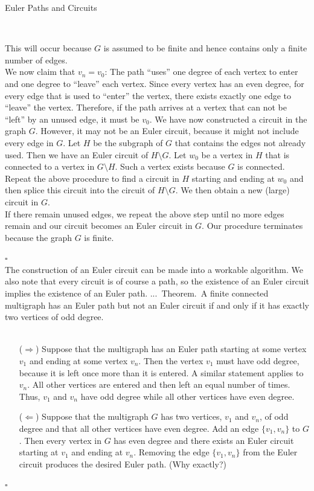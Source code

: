 \documentclass[smaller,hyperref={CJKbookmarks=true}]{beamer}
\newenvironment{PROOF}{{\noindent\!\sf\alert{Proof.}}\\}{\hfill$\square$\\}
\newcounter{zhuo}[subsection]
\renewcommand{\thezhuo}{\thesection.\thesubsection.\arabic{zhuo}}
\newenvironment{THEOREM}{\stepcounter{zhuo}\alert{\thezhuo.~Theorem.\,}}{}
\begin{document}
\begin{frame}{Euler Paths and Circuits}
\begin{spacing}{1.15}
\begin{PROOF}
\begin{itemize}
This will occur because $G$ is assumed to be finite and hence contains
only a finite number of edges.\\[6pt]
We now claim that $v_n = v_0$: The path ``uses'' one degree of each
vertex to enter and one degree to ``leave'' each vertex. Since every
vertex has an even degree, for every edge that is used to ``enter'' the
vertex, there exists exactly one edge to ``leave'' the vertex. Therefore,
if the path arrives at a vertex that can not be ``left'' by an unused
edge, it must be $v_0$.
\newpage
We have now constructed a circuit in the graph $G$. However, it may
not be an Euler circuit, because it might not include every edge in $G$.
Let $H$ be the subgraph of $G$ that contains the edges not already used.
Then we have an Euler circuit of $H\setminus G$. Let $w_0$ be a vertex in $H$ that
is connected to a vertex in $G\setminus H$. Such a vertex exists because $G$ is
connected. Repeat the above procedure to find a circuit in $H$ starting
and ending at $w_0$ and then splice this circuit into the circuit of $H\setminus G$.
We then obtain a new (large) circuit in $G$.\\[6pt]
If there remain unused edges, we repeat the above step until no more
edges remain and our circuit becomes an Euler circuit in $G$. Our
procedure terminates because the graph $G$ is finite.
\end{itemize}
\end{PROOF}
The construction of an Euler circuit can be made into a workable
algorithm. We also note that every circuit is of course a path, so the
existence of an Euler circuit implies the existence of an Euler path.
\newpage
\begin{THEOREM}
A finite connected multigraph has an Euler path but not
an Euler circuit if and only if it has exactly two vertices of odd degree.\\[5pt]
\end{THEOREM}
\begin{PROOF}
\begin{itemize}
  \item[($\Rightarrow$)] Suppose that the multigraph has an Euler path starting at some vertex $v_1$ and ending at some vertex $v_n$. Then the vertex $v_1$ must have odd degree, because it is left once more than it is entered. A similar statement applies to $v_n$. All other vertices are entered and then left an equal number of times. Thus, $v_1$ and $v_n$ have odd degree while all other vertices have even degree.
  \item[($\Leftarrow$)] Suppose that the multigraph $G$ has two vertices, $v_1$ and $v_n$, of odd degree and that all other vertices have even degree. Add an edge $\{v_1, v_n\}$ to $G$. Then every vertex in $G$ has even degree and there exists an Euler circuit starting at $v_1$ and ending at $v_n$. Removing the edge $\{v_1, v_n\}$ from the Euler circuit produces the desired Euler path. (Why exactly?)
\end{itemize}
\end{PROOF}
\end{spacing}
\end{frame}
\end{document}
